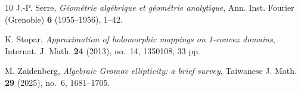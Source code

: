\documentclass[12pt]{amsart}
\theoremstyle{definition}
\numberwithin{equation}{section}
\numberwithin{figure}{section}
\numberwithin{equation}{section}
\begin{document}
\begin{thebibliography}{10}
J.-P. Serre,
\newblock \emph{G\'eom\'etrie alg\'ebrique et g\'eom\'etrie analytique},
\newblock Ann. Inst. Fourier (Grenoble) \textbf{6} (1955--1956), 1--42.

K. Stopar,
\newblock \emph{Approximation of holomorphic mappings on 1-convex domains},
\newblock Internat. J. Math. \textbf{24} (2013), no.~14, 1350108, 33 pp.

M. Zaidenberg,
\newblock \emph{Algebraic Gromov ellipticity: a brief survey},
\newblock Taiwanese J. Math. \textbf{29} (2025), no.~6, 1681--1705.

\end{thebibliography}
\end{document}

